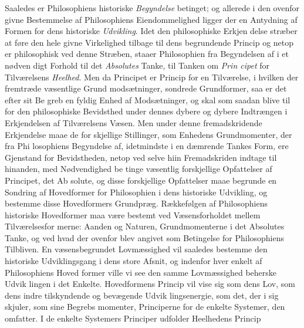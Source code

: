 \documentclass[12pt,a4paper]{book}
\begin{document}
Saaledes er Philosophiens historiske \emph{Begyndelse} betinget;
og allerede i den ovenfor givne Bestemmelse af Philosophiens
Eiendommelighed ligger der en Antydning af Formen for
dens historiske \emph{Udvikling}. Idet den philosophiske Erkjen\-%
delse stræber at føre den hele givne Virkelighed tilbage til
dens begrundende Princip og netop er philosophisk ved denne
Stræben, staaer Philosophien fra Begyndelsen af i et nødven\-%
digt Forhold til det \emph{Absolutes} Tanke, til Tanken om \emph{Prin\-%
cipet} for Tilværelsens \emph{Heelhed}. Men da Principet er Princip
for en Tilværelse, i hvilken der fremtræde væsentlige Grund\-%
modsætninger, sondrede Grundformer, saa er det efter sit Be\-%
greb en fyldig Enhed af Modsætninger, og skal som saadan
blive til for den philosophiske Bevidsthed under dennes dybere
og dybere Indtrængen i Erkjendelsen af Tilværelsens Væsen.
Men under denne fremadskridende Erkjendelse maae de for\-%
skjellige Stillinger, som Enhedens Grundmomenter, der fra Phi\-%
losophiens Begyndelse af, idetmindste i en dæmrende Tankes
Form, ere Gjenstand for Bevidstheden, netop ved selve hiin
Fremadskriden indtage til hinanden, med Nødvendighed be\-%
tinge væsentlig forskjellige Opfattelser af Principet, det Ab\-%
solute, og disse forskjellige Opfattelser maae begrunde en
Sondring af Hovedformer for Philosophien i dens historiske
Udvikling, og bestemme disse Hovedformers Grundpræg.
Rækkefølgen af Philosophiens historiske Hovedformer maa
være bestemt ved Væsensforholdet mellem Tilværelsesfor\-%
merne: Aanden og Naturen, Grundmomenterne i det Absolutes
Tanke, og ved hvad der ovenfor blev angivet som Betingelse
for Philosophiens Tilbliven. En væsensbegrundet Lovmæssighed
vil saaledes bestemme den historiske Udviklingsgang i dens
store Afsnit, og indenfor hver enkelt af Philosophiens Hoved\-%
former ville vi see den samme Lovmæssighed beherske Udvik\-%
lingen i det Enkelte. Hovedformens Princip vil vise sig som
dens Lov, som dens indre tilskyndende og bevægende Udvik\-%
lingsenergie, som det, der i sig skjuler, som sine Begrebs\-%
momenter, Principerne for de enkelte Systemer, den omfatter.
I de enkelte Systemers Principer udfolder Heelhedens Princip
\end{document}
